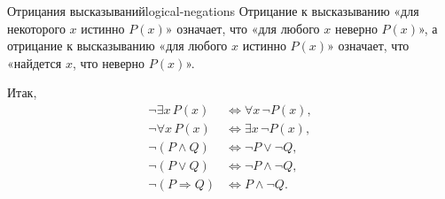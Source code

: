 \begin{properties}{Отрицания высказываний}{logical-negations}
  Отрицание к высказыванию «для некоторого $x$ истинно $P(x)$» означает,
  что «для любого $x$ неверно $P(x)$», а отрицание к высказыванию «для любого
  $x$ истинно $P(x)$» означает, что «найдется $x$, что неверно $P(x)$».

  Итак,
  \begin{align*}
    \neg\exists x\,P(x)&\Leftrightarrow\forall x\,\neg P(x),\\
    \neg\forall x\,P(x)&\Leftrightarrow\exists x\,\neg P(x),\\
    \neg(P\land Q)&\Leftrightarrow\neg P\lor\neg Q,\\
    \neg(P\lor Q)&\Leftrightarrow\neg P\land\neg Q,\\
    \neg(P\Rightarrow Q)&\Leftrightarrow P\land\neg Q.
  \end{align*}
\end{properties}
